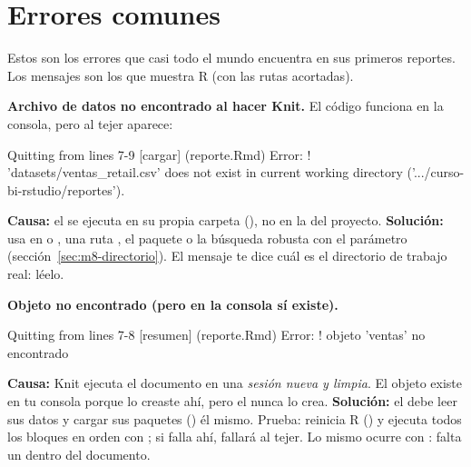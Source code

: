 \section{Errores comunes}
\label{sec:m8-errores}

Estos son los errores que casi todo el mundo encuentra en sus primeros
reportes. Los mensajes son los que muestra R (con las rutas acortadas).

\begin{advertencia}
\textbf{Archivo de datos no encontrado al hacer Knit.} El código funciona
en la consola, pero al tejer aparece:
\end{advertencia}

\begin{textocodigo}
Quitting from lines 7-9 [cargar] (reporte.Rmd)
Error:
! 'datasets/ventas_retail.csv' does not exist in current working
  directory ('.../curso-bi-rstudio/reportes').
\end{textocodigo}

\textbf{Causa:} el  se ejecuta en su propia carpeta
(), no en la del proyecto. \textbf{Solución:} usa
 en  o
, una ruta
, el paquete  o la búsqueda robusta con
el parámetro  (sección~\ref{sec:m8-directorio}). El
mensaje te dice cuál es el directorio de trabajo real: léelo.

\begin{advertencia}
\textbf{Objeto no encontrado (pero en la consola sí existe).}
\end{advertencia}

\begin{textocodigo}
Quitting from lines 7-8 [resumen] (reporte.Rmd)
Error:
! objeto 'ventas' no encontrado
\end{textocodigo}

\textbf{Causa:} Knit ejecuta el documento en una \emph{sesión nueva y
limpia}. El objeto  existe en tu consola porque lo creaste
ahí, pero el  nunca lo crea. \textbf{Solución:} el
 debe leer sus datos y cargar sus paquetes ()
él mismo. Prueba: reinicia R () y ejecuta todos
los bloques en orden con ; si falla ahí, fallará al
tejer. Lo mismo ocurre con : falta
un  dentro del documento.

